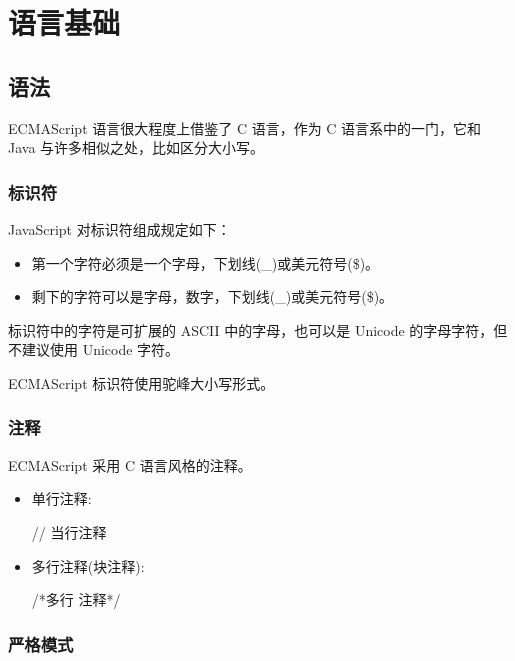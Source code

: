 \section{语言基础}
\subsection{语法}

ECMAScript 语言很大程度上借鉴了 C 语言，作为 C 语言系中的一门，它和 Java 与许多相似之处，比如区分大小写。

\subsubsection*{标识符}

JavaScript 对标识符组成规定如下：
\begin{itemize}
    \item 第一个字符必须是一个字母，下划线(\_)或美元符号(\$)。
    \item 剩下的字符可以是字母，数字，下划线(\_)或美元符号(\$)。
\end{itemize}

标识符中的字符是可扩展的 ASCII 中的字母，也可以是 Unicode 的字母字符，但不建议使用 Unicode 字符。


ECMAScript 标识符使用驼峰大小写形式。

\subsubsection*{注释}
ECMAScript 采用 C 语言风格的注释。
\begin{itemize}
    \item 单行注释:
    
    \begin{JavaScript}
    // 当行注释
    \end{JavaScript}
    \item 多行注释(块注释):
    \begin{JavaScript}
    /*多行
    注释*/
    \end{JavaScript}
\end{itemize}

\subsubsection*{严格模式}

